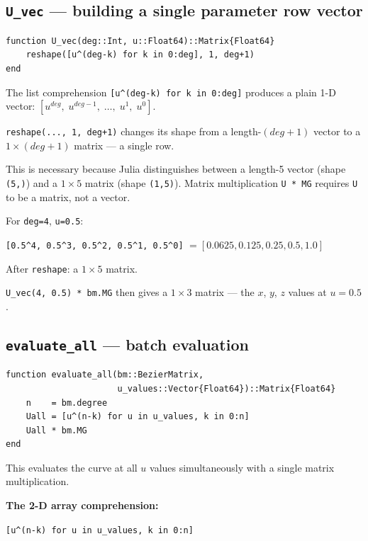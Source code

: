 \documentclass[12pt, a4paper]{article}
\newcommand{\cd}[1]{\texttt{#1}}
\begin{document}
\subsection{\texttt{U\_vec} --- building a single parameter row vector}

\begin{verbatim}
function U_vec(deg::Int, u::Float64)::Matrix{Float64}
    reshape([u^(deg-k) for k in 0:deg], 1, deg+1)
end
\end{verbatim}

The list comprehension \cd{[u\^{}(deg-k) for k in 0:deg]}
produces a plain 1-D vector:
$[u^{deg},\; u^{deg-1},\; \ldots,\; u^1,\; u^0]$.

\cd{reshape(..., 1, deg+1)} changes its shape from
a length-$(deg+1)$ vector to a $1 \times (deg+1)$ matrix
--- a single row.

This is necessary because Julia distinguishes between
a length-5 vector (shape \cd{(5,)}) and a $1 \times 5$ matrix
(shape \cd{(1,5)}).
Matrix multiplication \cd{U * MG} requires \cd{U} to be
a matrix, not a vector.

\begin{examplebox}
For \cd{deg=4}, \cd{u=0.5}:

\cd{[0.5\^{}4, 0.5\^{}3, 0.5\^{}2, 0.5\^{}1, 0.5\^{}0]}
$= [0.0625, 0.125, 0.25, 0.5, 1.0]$

After \cd{reshape}: a $1 \times 5$ matrix.

\cd{U\_vec(4, 0.5) * bm.MG} then gives a $1 \times 3$ matrix ---
the $x$, $y$, $z$ values at $u = 0.5$.
\end{examplebox}

\subsection{\texttt{evaluate\_all} --- batch evaluation}

\begin{verbatim}
function evaluate_all(bm::BezierMatrix,
                      u_values::Vector{Float64})::Matrix{Float64}
    n    = bm.degree
    Uall = [u^(n-k) for u in u_values, k in 0:n]
    Uall * bm.MG
end
\end{verbatim}

This evaluates the curve at all $u$ values simultaneously
with a single matrix multiplication.

\textbf{The 2-D array comprehension:}

\cd{[u\^{}(n-k) for u in u\_values, k in 0:n]}
\end{document}
